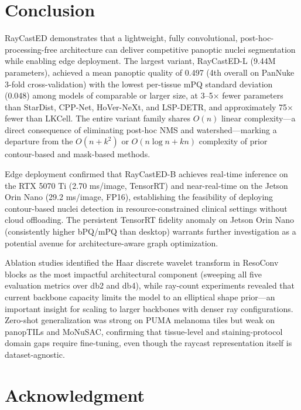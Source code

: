 \documentclass[conference]{IEEEtran}
\begin{document}
\section{Conclusion}

RayCastED demonstrates that a lightweight, fully convolutional, post-hoc-processing-free architecture can deliver competitive panoptic nuclei segmentation while enabling edge deployment. The largest variant, RayCastED-L (9.44M parameters), achieved a mean panoptic quality of 0.497 (4th overall on PanNuke 3-fold cross-validation) with the lowest per-tissue mPQ standard deviation (0.048) among models of comparable or larger size, at 3--5$\times$ fewer parameters than StarDist, CPP-Net, HoVer-NeXt, and LSP-DETR, and approximately 75$\times$ fewer than LKCell. The entire variant family shares $O(n)$ linear complexity---a direct consequence of eliminating post-hoc NMS and watershed---marking a departure from the $O(n + k^2)$ or $O(n \log n + kn)$ complexity of prior contour-based and mask-based methods.

Edge deployment confirmed that RayCastED-B achieves real-time inference on the RTX 5070 Ti (2.70 ms/image, TensorRT) and near-real-time on the Jetson Orin Nano (29.2 ms/image, FP16), establishing the feasibility of deploying contour-based nuclei detection in resource-constrained clinical settings without cloud offloading. The persistent TensorRT fidelity anomaly on Jetson Orin Nano (consistently higher bPQ/mPQ than desktop) warrants further investigation as a potential avenue for architecture-aware graph optimization.

Ablation studies identified the Haar discrete wavelet transform in ResoConv blocks as the most impactful architectural component (sweeping all five evaluation metrics over db2 and db4), while ray-count experiments revealed that current backbone capacity limits the model to an elliptical shape prior---an important insight for scaling to larger backbones with denser ray configurations. Zero-shot generalization was strong on PUMA melanoma tiles but weak on panopTILs and MoNuSAC, confirming that tissue-level and staining-protocol domain gaps require fine-tuning, even though the raycast representation itself is dataset-agnostic.


\section*{Acknowledgment}

{}

\end{document}
